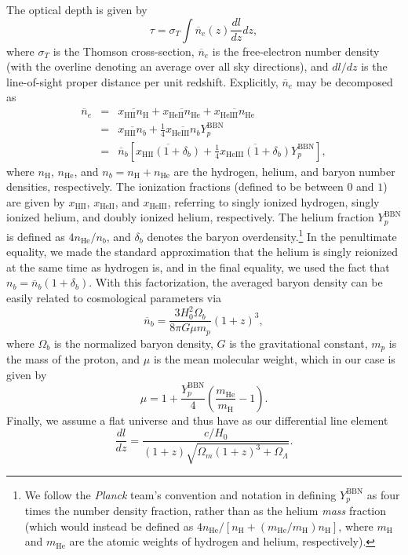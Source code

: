 \documentclass[twocolumn,aps,prd,nofootinbib,showpacs,superscriptaddress]{revtex4-1}
\begin{document}
The optical depth is given by
\begin{equation}
\tau = \sigma_T \int    \overline{n}_e (z)  \frac{dl}{dz} dz,
\end{equation}
where $\sigma_T$ is the Thomson cross-section, $\overline{n}_e$ is the free-electron number density (with the overline denoting an average over all sky directions), and $dl/dz$ is the line-of-sight proper distance per unit redshift. Explicitly, $\overline{n}_e$ may be decomposed as
\begin{eqnarray}
\overline{n}_e &=& \overline{x_\textrm{HII} n_\textrm{H}} + \overline{x_\textrm{HeII} n_\textrm{He}} + \overline{x_\textrm{HeIII} n_\textrm{He}} \nonumber \\
&=& \overline{x_\textrm{HII} n_b} + \frac{1}{4}\overline{x_\textrm{HeIII} n_b}Y_p^\textrm{BBN} \nonumber \\
&=& \overline{n}_b \left[  \overline{x_\textrm{HII} (1+\delta_b)} + \frac{1}{4}\overline{x_\textrm{HeIII} (1+\delta_b)} Y_p^\textrm{BBN} \right],
\end{eqnarray}
where $n_\textrm{H}$, $n_\textrm{He}$, and $n_b = n_\textrm{H} + n_\textrm{He}$ are the hydrogen, helium, and baryon number densities, respectively. The ionization fractions (defined to be between $0$ and $1$) are given by $x_\textrm{HII}$, $x_\textrm{HeII}$, and $x_\textrm{HeIII}$, referring to singly ionized hydrogen, singly ionized helium, and doubly ionized helium, respectively. The helium fraction $Y_p^\textrm{BBN}$ is defined as $4n_\textrm{He} / n_b$, and $\delta_b$ denotes the baryon overdensity.\footnote{We follow the \emph{Planck} team's convention and notation in defining $Y_p^\textrm{BBN}$ as four times the number density fraction, rather than as the helium \emph{mass} fraction (which would instead be defined as $4n_\textrm{He} / [n_\textrm{H} + (m_\textrm{He} / m_\textrm{H}) n_\textrm{H} ]$, where $m_\textrm{H}$ and $m_\textrm{He}$ are the atomic weights of hydrogen and helium, respectively).} In the penultimate equality, we made the standard approximation that the helium is singly reionized at the same time as hydrogen is, and in the final equality, we used the fact that $n_b =\overline{n}_b ( 1+ \delta_b)$. With this factorization, the averaged baryon density can be easily related to cosmological parameters via
\begin{equation}
\overline{n}_b = \frac{3 H_0^2 \Omega_b}{8 \pi G \mu m_p} (1+z)^3,
\end{equation}
where $\Omega_b$ is the normalized baryon density, $G$ is the gravitational constant, $m_p$ is the mass of the proton, and $\mu$ is the mean molecular weight, which in our case is given by
\begin{equation}
\mu = 1 + \frac{Y_p^\textrm{BBN}}{4} \left( \frac{m_\textrm{He}}{m_\textrm{H}} - 1\right).
\end{equation}
Finally, we assume a flat universe and thus have as our differential line element
\begin{equation}
\frac{dl}{dz} =  \frac{c/H_0}{(1+z) \sqrt{\Omega_m (1+z)^3 + \Omega_\Lambda}}.
\end{equation}
\end{document}
